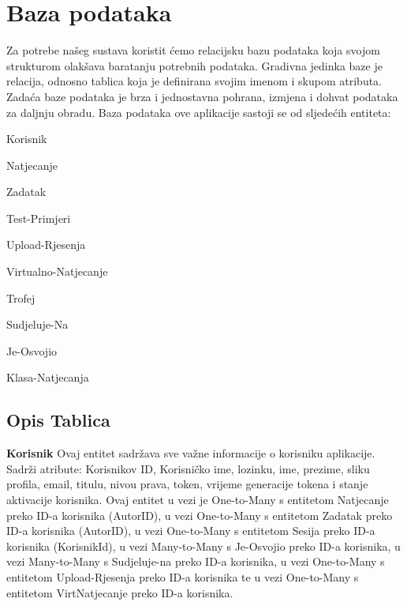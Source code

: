 				
		\section{Baza podataka}
		
		
		
		\noindent Za potrebe našeg sustava koristit  ćemo relacijsku bazu podataka koja svojom strukturom olakšava baratanju potrebnih podataka. Gradivna jedinka baze je relacija, odnosno tablica koja je definirana svojim imenom i skupom atributa. Zadaća baze podataka je brza i jednostavna pohrana, izmjena i dohvat podataka za daljnju obradu.
		Baza podataka ove aplikacije sastoji se od sljedećih entiteta:
		\begin{packed_item}
			\item Korisnik
			\item Natjecanje
			\item Zadatak
			\item Test-Primjeri
			\item Upload-Rjesenja
			\item Virtualno-Natjecanje
			\item Trofej
			\item Sudjeluje-Na
			\item Je-Osvojio
			\item Klasa-Natjecanja
		\end{packed_item}
		\subsection{Opis Tablica}
		\noindent \textbf{Korisnik} \space \space Ovaj entitet sadržava sve važne informacije o korisniku aplikacije.
		Sadrži atribute: Korisnikov ID, Korisničko ime, lozinku, ime, prezime, sliku profila, email, titulu, nivou prava, token, vrijeme generacije tokena i stanje aktivacije korisnika. Ovaj entitet u vezi je
		One-to-Many s entitetom Natjecanje preko ID-a korisnika (AutorID), u vezi One-to-Many s entitetom Zadatak preko ID-a korisnika (AutorID), u vezi One-to-Many s entitetom Sesija preko ID-a korisnika (KorisnikId), u vezi Many-to-Many s  Je-Osvojio preko ID-a korisnika, u vezi Many-to-Many s  Sudjeluje-na preko ID-a korisnika, u vezi One-to-Many s entitetom Upload-Rjesenja preko ID-a korisnika  te u vezi One-to-Many s entitetom VirtNatjecanje preko ID-a korisnika.
		
